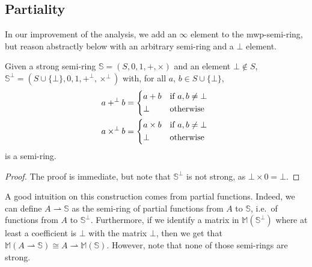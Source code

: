 \documentclass[runningheads]{llncs}
\begin{document}
\subsection{Partiality}
\label{sec:app:partiality}

In our improvement of the analysis, we add an \(\infty\) element to the mwp-semi-ring, but reason abstractly below with an arbitrary semi-ring and a \(\bot\) element.

\begin{lemma}
	Given a strong semi-ring \(\mathbb{S} = (S,0,1,+,\times )\) and an element \(\bot \notin S\), \(\mathbb{S}^{\bot} = (S \cup \{\bot\},0,1,+^{\bot},\times^{\bot} )\) with, for all \(a\), \(b \in S \cup \{\bot\}\),
	\begin{align*}
		a +^{\bot} b      & =\begin{dcases*}
			a + b & if \(a, b \neq \bot\) \\
			\bot  & otherwise
		\end{dcases*} \\
		a \times^{\bot} b & =\begin{dcases*}
			a \times b & if \(a, b \neq \bot\) \\
			\bot       & otherwise
		\end{dcases*}
	\end{align*}
	is a semi-ring.
\end{lemma}

\begin{proof}
	The proof is immediate, but note that \(\mathbb{S}^{\bot}\) is not strong, as \(\bot \times 0 = \bot\).
\end{proof}

A good intuition on this construction comes from partial functions.
Indeed, we can define \(A \rightharpoonup \mathbb{S}\) as the semi-ring of partial functions from \(A\) to \(\mathbb{S}\), i.e.\ of functions from \(A\) to \(\mathbb{S}^{\bot}\).
Furthermore, if we identify a matrix in \(\mathbb{M} (\mathbb{S}^{\bot})\) where at least a coefficient is \(\bot \) with the matrix \(\bot\), then we get that \(\mathbb{M} (A \rightharpoonup \mathbb{S} ) \cong A \rightharpoonup \mathbb{M} (\mathbb{S} )\).
However, note that none of those semi-rings are strong.
\end{document}
